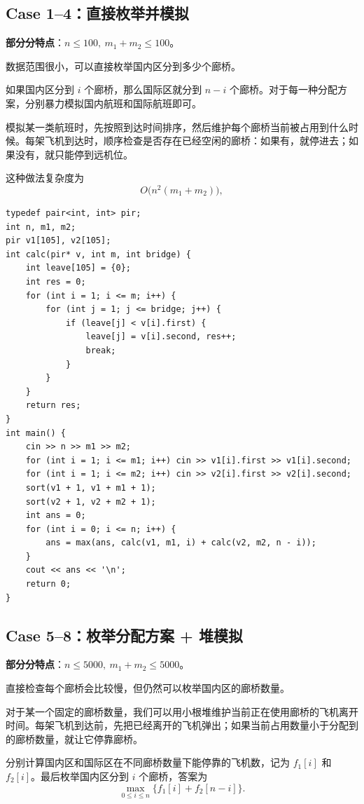 \documentclass{book}
\begin{document}
\newpage
\subsection{Case 1--4：直接枚举并模拟}

\textbf{部分分特点}：$n\le 100,\ m_1+m_2\le 100$。

数据范围很小，可以直接枚举国内区分到多少个廊桥。

如果国内区分到 $i$ 个廊桥，那么国际区就分到 $n-i$ 个廊桥。对于每一种分配方案，分别暴力模拟国内航班和国际航班即可。

模拟某一类航班时，先按照到达时间排序，然后维护每个廊桥当前被占用到什么时候。每架飞机到达时，顺序检查是否存在已经空闲的廊桥：如果有，就停进去；如果没有，就只能停到远机位。

这种做法复杂度为
\[
O\bigl(n^2(m_1+m_2)\bigr),
\]

\begin{lstlisting}[style = code]
typedef pair<int, int> pir;
int n, m1, m2;
pir v1[105], v2[105];
int calc(pir* v, int m, int bridge) {
    int leave[105] = {0};
    int res = 0;
    for (int i = 1; i <= m; i++) {
        for (int j = 1; j <= bridge; j++) {
            if (leave[j] < v[i].first) {
                leave[j] = v[i].second, res++;
                break;
            }
        }
    }
    return res;
}
int main() {
    cin >> n >> m1 >> m2;
    for (int i = 1; i <= m1; i++) cin >> v1[i].first >> v1[i].second;
    for (int i = 1; i <= m2; i++) cin >> v2[i].first >> v2[i].second;
    sort(v1 + 1, v1 + m1 + 1);
    sort(v2 + 1, v2 + m2 + 1);
    int ans = 0;
    for (int i = 0; i <= n; i++) {
        ans = max(ans, calc(v1, m1, i) + calc(v2, m2, n - i));
    }
    cout << ans << '\n';
    return 0;
}
\end{lstlisting}

\newpage
\subsection{Case 5--8：枚举分配方案 + 堆模拟}

\textbf{部分分特点}：$n\le 5000,\ m_1+m_2\le 5000$。

直接检查每个廊桥会比较慢，但仍然可以枚举国内区的廊桥数量。

对于某一个固定的廊桥数量，我们可以用小根堆维护当前正在使用廊桥的飞机离开时间。每架飞机到达前，先把已经离开的飞机弹出；如果当前占用数量小于分配到的廊桥数量，就让它停靠廊桥。

分别计算国内区和国际区在不同廊桥数量下能停靠的飞机数，记为 $f_1[i]$ 和 $f_2[i]$。最后枚举国内区分到 $i$ 个廊桥，答案为
\[
\max_{0\le i\le n}\{f_1[i]+f_2[n-i]\}.
\]
\end{document}
